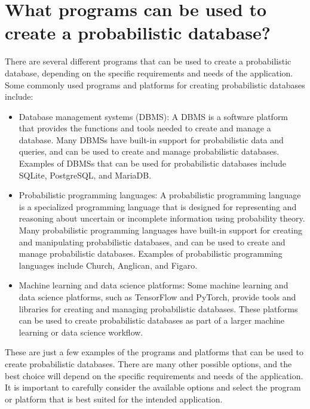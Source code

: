 \chapter{ What programs can be used to create a probabilistic database? }

There are several different programs that can be used to create a probabilistic database, depending on the specific requirements and needs of the application. Some commonly used programs and platforms for creating probabilistic databases include:

\begin{itemize}
	\item Database management systems (DBMS): A DBMS is a software platform that provides the functions and tools needed to create and manage a database. Many DBMSs have built-in support for probabilistic data and queries, and can be used to create and manage probabilistic databases. Examples of DBMSs that can be used for probabilistic databases include SQLite, PostgreSQL, and MariaDB.
	
	\item Probabilistic programming languages: A probabilistic programming language is a specialized programming language that is designed for representing and reasoning about uncertain or incomplete information using probability theory. Many probabilistic programming languages have built-in support for creating and manipulating probabilistic databases, and can be used to create and manage probabilistic databases. Examples of probabilistic programming languages include Church, Anglican, and Figaro.
	
	\item Machine learning and data science platforms: Some machine learning and data science platforms, such as TensorFlow and PyTorch, provide tools and libraries for creating and managing probabilistic databases. These platforms can be used to create probabilistic databases as part of a larger machine learning or data science workflow.
	
\end{itemize}


These are just a few examples of the programs and platforms that can be used to create probabilistic databases. There are many other possible options, and the best choice will depend on the specific requirements and needs of the application. It is important to carefully consider the available options and select the program or platform that is best suited for the intended application.
